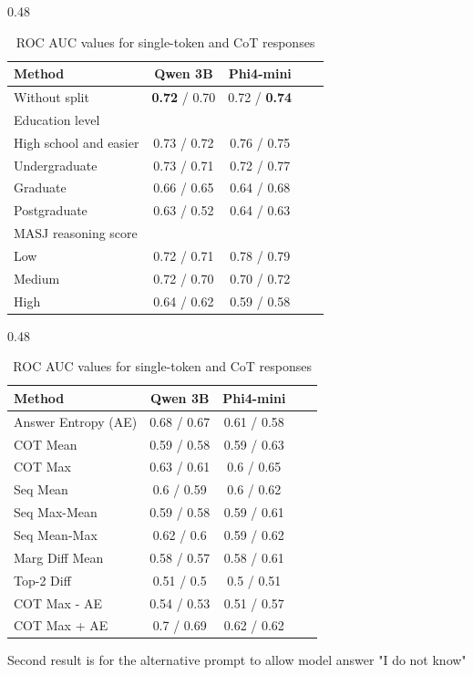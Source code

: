 \begin{table}[h]
    \centering
    \begin{subtable}[t]{0.48\linewidth}
        \centering
        \begin{tabular}{l c c c c}
            \hline
            Method & Qwen 3B & Phi4-mini \\
            \hline
            Without split & \textbf{0.72} / 0.70 & 0.72 / \textbf{0.74} \\
            \hline
            Education level \\
            \hline
            High school and easier & 0.73 / 0.72 & 0.76 / 0.75 \\
            Undergraduate & 0.73 / 0.71 & 0.72 / 0.77 \\
            Graduate & 0.66 / 0.65 & 0.64 / 0.68 \\
            Postgraduate & 0.63 / 0.52 & 0.64 / 0.63 \\
            \hline
            MASJ reasoning score \\
            \hline
            Low & 0.72 / 0.71 & 0.78 / 0.79 \\
            Medium & 0.72 / 0.70 & 0.70 / 0.72 \\
            High & 0.64 / 0.62 & 0.59 / 0.58 \\
            \hline
        \end{tabular}
        \caption{ROC AUC values for single-token response}
    \end{subtable}
    \hfill
    \begin{subtable}[t]{0.48\linewidth}
        \centering
        \begin{tabular}{l c c c c}
            \hline
            Method & Qwen 3B & Phi4-mini \\
            \hline
            Answer Entropy (AE) & 0.68 / 0.67 & 0.61 / 0.58 \\
            COT Mean & 0.59 / 0.58 & 0.59 / 0.63 \\
            COT Max & 0.63 / 0.61 & 0.6 / 0.65 \\
            Seq Mean & 0.6 / 0.59 & 0.6 / 0.62 \\
            Seq Max-Mean & 0.59 / 0.58 & 0.59 / 0.61 \\
            Seq Mean-Max & 0.62 / 0.6 & 0.59 / 0.62 \\
            Marg Diff Mean & 0.58 / 0.57 & 0.58 / 0.61 \\
            Top-2 Diff & 0.51 / 0.5 & 0.5 / 0.51 \\
            COT Max - AE & 0.54 / 0.53 & 0.51 / 0.57 \\
            COT Max + AE & 0.7 / 0.69 & 0.62 / 0.62 \\
            \hline
        \end{tabular}
        \caption{ROC AUC values for CoT response}
    \end{subtable}
    \caption{ROC AUC values for single-token and CoT responses}
    \label{tab:roc_auc}
    \footnotesize{Second result is for the alternative prompt to allow model answer "I do not know"}\\
\end{table}

